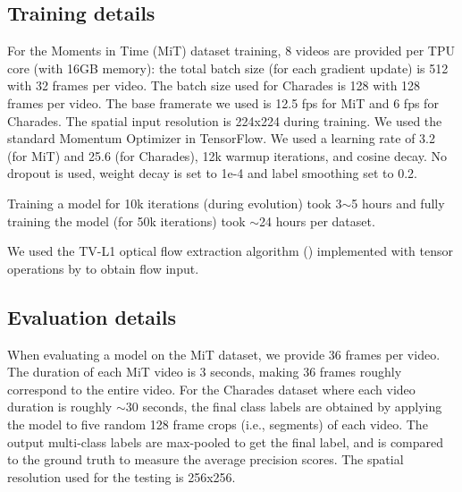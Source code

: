 \documentclass{article} \usepackage{iclr2020_conference,times}
\begin{document}
\subsection{Training details}

For the Moments in Time (MiT) dataset training, 8 videos are provided per TPU core (with 16GB memory): the total batch size (for each gradient update) is 512 with 32 frames per video. The batch size used for Charades is 128 with 128 frames per video. The base framerate we used is 12.5 fps for MiT and 6 fps for Charades. The spatial input resolution is 224x224 during training. We used the standard Momentum Optimizer in TensorFlow. We used a learning rate of 3.2 (for MiT) and 25.6 (for Charades), 12k warmup iterations, and cosine decay. No dropout is used, weight decay is set to 1e-4 and label smoothing set to 0.2. 

Training a model for 10k iterations (during evolution) took 3$\sim$5 hours and fully training the model (for 50k iterations) took $\sim$24 hours per dataset.

We used the TV-L1 optical flow extraction algorithm (\citealp{zach2007duality}) implemented with tensor operations by \cite{piergiovanni2018representation} to obtain flow input.


\subsection{Evaluation details}

When evaluating a model on the MiT dataset, we provide 36 frames per video. The duration of each MiT video is 3 seconds, making 36 frames roughly correspond to the entire video. For the Charades dataset where each video duration is roughly $\sim$30 seconds, the final class labels are obtained by applying the model to five random 128 frame crops (i.e., segments) of each video. The output multi-class labels are max-pooled to get the final label, and is compared to the ground truth to measure the average precision scores. The spatial resolution used for the testing is 256x256.
\end{document}
